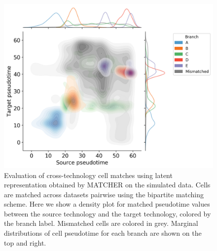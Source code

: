 \begin{figure}[htp]
    \centering
    \includegraphics[width=1.0\textwidth]{figures/integration/matcher-pseudotime-kde.png}
    \caption{
    Evaluation of cross-technology cell matches using latent representation obtained by MATCHER on the simulated data.
    Cells are matched across datasets pairwise using the bipartite matching scheme.
    Here we show a density plot for matched pseudotime values between the source technology and the target technology,
    colored by the branch label. Mismatched cells are colored in grey.
    Marginal distributions of cell pseudotime for each branch are shown on the top and right.
    }
    \label{fig:prosstt5-matcher-psuedotime}
\end{figure}

